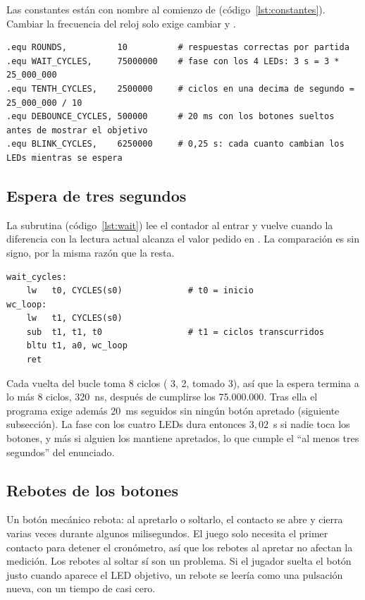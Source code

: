 Las constantes están con nombre al comienzo de 
(código~\ref{lst:constantes}). Cambiar la frecuencia del reloj solo exige cambiar
 y .

\begin{lstlisting}[language=rvasm, caption={Constantes de tiempo en \code{sw/game.s}.}, label={lst:constantes}]
.equ ROUNDS,          10          # respuestas correctas por partida
.equ WAIT_CYCLES,     75000000    # fase con los 4 LEDs: 3 s = 3 * 25_000_000
.equ TENTH_CYCLES,    2500000     # ciclos en una decima de segundo = 25_000_000 / 10
.equ DEBOUNCE_CYCLES, 500000      # 20 ms con los botones sueltos antes de mostrar el objetivo
.equ BLINK_CYCLES,    6250000     # 0,25 s: cada cuanto cambian los LEDs mientras se espera
\end{lstlisting}

\subsection{Espera de tres segundos}

La subrutina  (código~\ref{lst:wait}) lee el contador al entrar y
vuelve cuando la diferencia con la lectura actual alcanza el valor pedido en
. La comparación  es sin signo, por la misma razón que la resta.

\begin{lstlisting}[language=rvasm, caption={Espera de \code{a0} ciclos.}, label={lst:wait}]
wait_cycles:
    lw   t0, CYCLES(s0)             # t0 = inicio
wc_loop:
    lw   t1, CYCLES(s0)
    sub  t1, t1, t0                 # t1 = ciclos transcurridos
    bltu t1, a0, wc_loop
    ret
\end{lstlisting}

Cada vuelta del bucle toma 8 ciclos ( 3,  2,  tomado 3),
así que la espera termina a lo más 8 ciclos, 320~ns, después de cumplirse los
75.000.000. Tras ella el programa exige además 20~ms seguidos sin ningún botón
apretado (siguiente subsección). La fase con los cuatro LEDs dura entonces
$3{,}02$~s si nadie toca los botones, y más si alguien los mantiene apretados, lo que
cumple el ``al menos tres segundos'' del enunciado.

\subsection{Rebotes de los botones}

Un botón mecánico rebota: al apretarlo o soltarlo, el contacto se abre y cierra varias
veces durante algunos milisegundos. El juego solo necesita el primer contacto para
detener el cronómetro, así que los rebotes al apretar no afectan la medición. Los
rebotes al soltar sí son un problema. Si el jugador suelta el botón justo cuando
aparece el LED objetivo, un rebote se leería como una pulsación nueva, con un tiempo de
casi cero.

